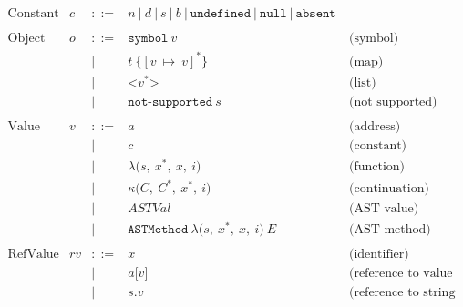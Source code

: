\documentclass[11pt]{article}
\newcommand{\Term}[1]{\texttt{#1}}
\newcommand{\symctx}[0]{C}
\newcommand{\symctxstack}[0]{C^*}
\newcommand{\symast}[0]{ASTVal}
\newcommand{\symrefv}[0]{rv}
\newcommand{\valfunc}[4]{\lambda \Term{(} #1,\ #2,\ #3,\ #4 \Term{)}}
\newcommand{\valcont}[4]{\kappa \Term{(} #1,\ #2,\ #3,\ #4 \Term{)}}
\begin{document}
\[
\begin{array}{rrrll}
\text{Constant} & c & ::= & n\ |\ d\ |\ s\ |\ b\ |\
\Term{undefined}\ |\ \Term{null}\ |\ \Term{absent}\ & \\
\\
\text{Object} & o & ::= & \Term{symbol}\ v & \text{(symbol)}\\
&&|& t\ \Term{\{} [v\ \mapsto\ v]^* \Term{\}} & \text{(map)}\\
&&|& \Term{<} v^* \Term{>} & \text{(list)}\\
&&|& \Term{not-supported}\ s & \text{(not supported)}\\
\\
\text{Value} & v & ::= & a & \text{(address)} \\
&&|& c & \text{(constant)}\\
&&|& \valfunc{s}{x^*}{x}{i} & \text{(function)} \\
&&|& \valcont{\symctx}{\symctxstack}{x^*}{i} & \text{(continuation)} \\
&&|& \symast & \text{(AST value)}\\
&&|& \Term{ASTMethod}\ \valfunc{s}{x^*}{x}{i}\ E & \text{(AST method)}\\
\\

\text{RefValue} & \symrefv & ::= & x & \text{(identifier)}\\
&&|& a\Term{[} v \Term{]} & \text{(reference to value of map in heap)}\\
&&|& s\Term{.}v & \text{(reference to string field)}\\
\\


\end{array}
\]
\end{document}
